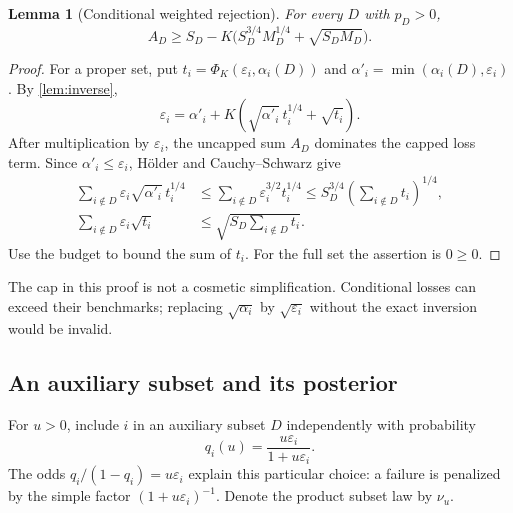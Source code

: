 \documentclass[11pt,reqno]{amsart}
\numberwithin{equation}{section}
\newtheorem{lemma}[theorem]{Lemma}
\theoremstyle{definition}
\theoremstyle{remark}
\newcommand{\eps}{\varepsilon}
\newcommand{\PhiK}{\Phi_K}
\begin{document}
\begin{lemma}[Conditional weighted rejection]\label{lem:weighted}
For every \(D\) with \(p_D>0\),
\begin{equation}\label{eq:weighted}
 A_D\ge S_D-K\bigl(S_D^{3/4}M_D^{1/4}+\sqrt{S_DM_D}\bigr).
\end{equation}
\end{lemma}
\begin{proof}
For a proper set, put \(t_i=\PhiK(\eps_i,\alpha_i(D))\) and
\(\alpha'_i=\min(\alpha_i(D),\eps_i)\). By \cref{lem:inverse},
\[
 \eps_i=\alpha'_i+
 K(\sqrt{\alpha'_i}\,t_i^{1/4}+\sqrt{t_i}).
\]
After multiplication by \(\eps_i\), the uncapped sum \(A_D\) dominates the capped loss term. Since \(\alpha'_i\le\eps_i\), Hölder and Cauchy--Schwarz give
\begin{align*}
 \sum_{i\notin D}\eps_i\sqrt{\alpha'_i}\,t_i^{1/4}
 &\le \sum_{i\notin D}\eps_i^{3/2}t_i^{1/4}
 \le S_D^{3/4}\left(\sum_{i\notin D}t_i\right)^{1/4},\\
 \sum_{i\notin D}\eps_i\sqrt{t_i}
 &\le\sqrt{S_D\sum_{i\notin D}t_i}.
\end{align*}
Use the budget to bound the sum of \(t_i\). For the full set the assertion is \(0\ge0\).
\end{proof}
The cap in this proof is not a cosmetic simplification. Conditional losses can exceed their benchmarks; replacing \(\sqrt{\alpha_i}\) by \(\sqrt{\eps_i}\) without the exact inversion would be invalid.

\subsection{An auxiliary subset and its posterior}
For \(u>0\), include \(i\) in an auxiliary subset \(D\) independently with probability
\begin{equation}\label{eq:testodds}
 q_i(u)=\frac{u\eps_i}{1+u\eps_i}.
\end{equation}
The odds \(q_i/(1-q_i)=u\eps_i\) explain this particular choice: a failure is penalized by the simple factor \((1+u\eps_i)^{-1}\). Denote the product subset law by \(\nu_u\).
\end{document}
